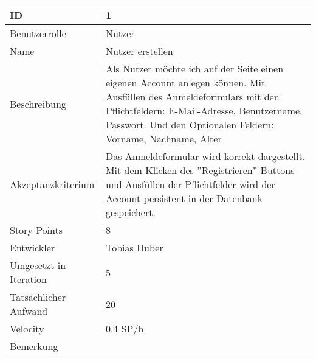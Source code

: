 \begin{tabularx}{\textwidth}{|p{}|X|}
		\hline
		ID & 1 \\
		\hline
		Benutzerrolle & Nutzer \\
		\hline
		Name & Nutzer erstellen \\
		\hline
		Beschreibung & Als Nutzer möchte ich auf der Seite einen eigenen Account anlegen können. Mit Ausfüllen des Anmeldeformulars mit den Pflichtfeldern:
		E-Mail-Adresse,
		Benutzername,
		Passwort.
		Und den Optionalen Feldern:
		Vorname,
		Nachname,
		Alter \\
		\hline
		Akzeptanzkriterium & Das Anmeldeformular wird korrekt dargestellt. Mit dem Klicken des ''Registrieren'' Buttons und Ausfüllen der Pflichtfelder wird der Account persistent in der Datenbank gespeichert. \\
		\hline
		Story Points & 8 \\
		\hline
		Entwickler & Tobias Huber \\
		\hline
		Umgesetzt in Iteration & 5 \\ 
		\hline
		Tatsächlicher Aufwand & 20 \\
		\hline
		Velocity & 0.4 SP/h \\
		\hline
		Bemerkung &  \\
		\hline
\end{tabularx}
\vspace{20pt}
